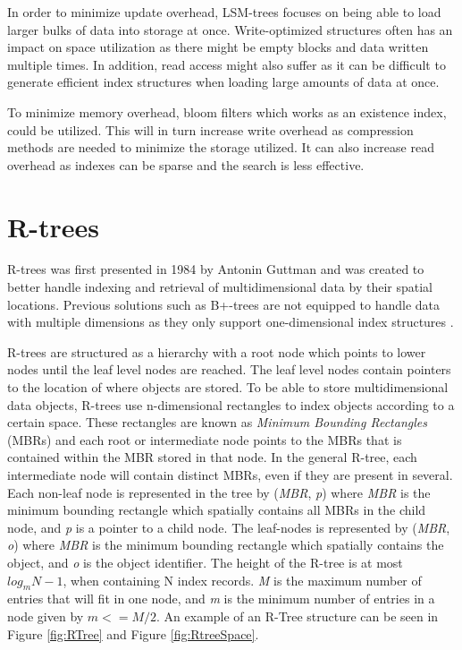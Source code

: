 \noindent
In order to minimize update overhead, LSM-trees focuses on being able to load larger bulks of data into storage at once. Write-optimized structures often has an impact on space utilization as there might be empty blocks and data written multiple times. In addition, read access might also suffer as it can be difficult to generate efficient index structures when loading large amounts of data at once.\newline

\noindent
To minimize memory overhead, bloom filters which works as an existence index, could be utilized. This will in turn increase write overhead as compression methods are needed to minimize the storage utilized. It can also increase read overhead as indexes can be sparse and the search is less effective.

\section{R-trees}
R-trees was first presented in 1984 by Antonin Guttman\cite{r-tree} and was created to better handle indexing and retrieval of multidimensional data by their spatial locations. Previous solutions such as B+-trees are not equipped to handle data with multiple dimensions as they only support one-dimensional index structures \cite{ComparisonOfAdvancedTree}. \newline

\noindent
R-trees are structured as a hierarchy with a root node which points to lower nodes until the leaf level nodes are reached. The leaf level nodes contain pointers to the location of where objects are stored. To be able to store multidimensional data objects, R-trees use n-dimensional rectangles to index objects according to a certain space. These rectangles are known as \emph{Minimum Bounding Rectangles} (MBRs) and each root or intermediate node points to the MBRs that is contained within the MBR stored in that node. In the general R-tree, each intermediate node will contain distinct MBRs, even if they are present in several. Each non-leaf node is represented in the tree by (\emph{MBR},  \emph{p}) where \emph{MBR} is the minimum bounding rectangle which spatially contains all MBRs in the child node, and \emph{p} is a pointer to a child node. The leaf-nodes is represented by (\emph{MBR}, \emph{o}) where \emph{MBR} is the minimum bounding rectangle which spatially contains the object, and \emph{o} is the object identifier. The height of the R-tree is at most \(log_mN-1\), when containing N index records. \emph{M} is the maximum number of entries that will fit in one node, and \emph{m} is the minimum number of entries in a node given by \(m <= M/2\). An example of an R-Tree structure can be seen in Figure \ref{fig:RTree} and Figure \ref{fig:RtreeSpace}.

